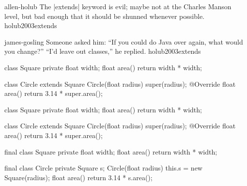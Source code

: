 \documentclass{article}
\begin{document}
\lnQuote
  {allen-holub}
  {The |extends| keyword is evil; maybe not at the Charles Manson level, but bad enough that it should be shunned whenever possible.}
  {holub2003extends}

\lnQuote
  {james-gosling}
  {Someone asked him: ``If you could do Java over again, what would you change?'' ``I'd leave out classes,'' he replied.}
  {holub2003extends}

\begin{lnSnippet}
class Square
  private float width;
  float area()
    return width * width;

class Circle extends Square
  Circle(float radius)
    super(radius);
  @Override float area()
    return 3.14 * super.area();
\end{lnSnippet}


\begin{lnSnippet}
class Square
  private float width;
  float area()
    return width * width;

class Circle extends Square
  Circle(float radius)
    super(radius);
  @Override float area()
    return 3.14 * super.area();
\end{lnSnippet}
\begin{lnSnippet}
final class Square
  private float width;
  float area()
    return width * width;

final class Circle
  private Square s;
  Circle(float radius)
    this.s = new Square(radius);
  float area()
    return 3.14 * s.area();
\end{lnSnippet}
\end{document}
